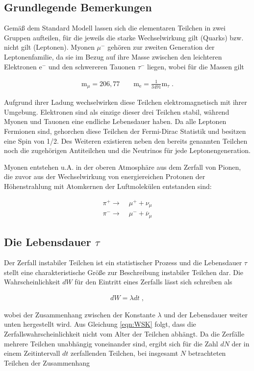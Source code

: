 \subsection{Grundlegende Bemerkungen}
Gemäß dem Standard Modell lassen sich die elementaren Teilchen in zwei Gruppen aufteilen, für die jeweils die starke Wechselwirkung gilt (Quarks) bzw. nicht gilt (Leptonen). Myonen $\mu^-$ gehören zur zweiten Generation der Leptonenfamilie, da sie im Bezug auf ihre Masse zwischen den leichteren Elektronen $\textrm{e}^-$ und den schwereren Tauonen $\tau^-$ liegen, wobei für die Massen gilt

\begin{align}
\textrm{m}_\mu = 206,77 \qquad \textrm{m}_{\textrm{e}} = \frac{1}{3491}\textrm{m}_{\tau}\;.
\end{align}

Aufgrund ihrer Ladung wechselwirken diese Teilchen elektromagnetisch mit ihrer Umgebung. Elektronen sind als einzige dieser drei Teilchen stabil, während Myonen und Tauonen eine endliche Lebensdauer haben. Da alle Leptonen Fermionen sind, gehorchen diese Teilchen der Fermi-Dirac Statistik und besitzen eine Spin von 1/2. Des Weiteren existieren neben den bereits genannten Teilchen noch die zugehörigen Antiteilchen und die Neutrinos für jede Leptonengeneration.

Myonen entstehen u.A. in der oberen Atmosphäre aus dem Zerfall von Pionen, die zuvor aus der Wechselwirkung von energiereichen Protonen der Höhenstrahlung mit Atomkernen der Luftmolekülen entstanden sind:

\begin{align}
\pi^+ \longrightarrow &\; \mu^+ + \nu_\mu \\
\pi^- \longrightarrow &\; \mu^- + \overline{\nu}_\mu 
\end{align}

\subsection{Die Lebensdauer $\tau$}
Der Zerfall instabiler Teilchen ist ein statistischer Prozess und die Lebensdauer $\tau$ stellt eine charakteristische Größe zur Beschreibung instabiler Teilchen dar. Die Wahrscheinlichkeit $dW$ für den Eintritt eines Zerfalls lässt sich schreiben als
 
\begin{align}
dW = \lambda dt \;, \label{eqn:WSK}
\end{align}

wobei der Zusammenhang zwischen der Konstante $\lambda$ und der Lebensdauer weiter unten hergestellt wird. Aus Gleichung \eqref{eqn:WSK} folgt, dass die Zerfallswahrscheinlichkeit nicht vom Alter der Teilchen abhängt. Da die Zerfälle mehrere Teilchen unabhängig voneinander sind, ergibt sich für die Zahl $dN$ der in einem Zeitintervall $dt$ zerfallenden Teilchen, bei insgesamt $N$ betrachteten Teilchen der Zusammenhang

